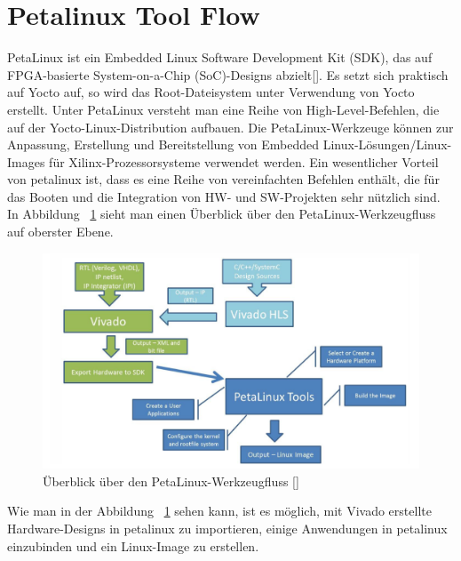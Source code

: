 \section{Petalinux Tool Flow}
\label{sec:Petalinux_Toolflow}
PetaLinux ist ein Embedded Linux Software Development Kit (SDK), das auf FPGA-basierte System-on-a-Chip (SoC)-Designs abzielt[\cite{Xilinx2020}]. Es setzt sich praktisch auf Yocto auf, so wird das Root-Dateisystem unter Verwendung von Yocto erstellt. Unter PetaLinux versteht man eine Reihe von High-Level-Befehlen, die auf der Yocto-Linux-Distribution aufbauen. Die PetaLinux-Werkzeuge können zur Anpassung, Erstellung und Bereitstellung von Embedded Linux-Lösungen/Linux-Images für Xilinx-Prozessorsysteme verwendet werden. 
Ein wesentlicher Vorteil von petalinux ist, dass es eine Reihe von vereinfachten Befehlen enthält, die für das Booten und die Integration von HW- und SW-Projekten sehr nützlich sind. In Abbildung ~\ref{fig:petalinux:tool:flow} sieht man einen Überblick über den PetaLinux-Werkzeugfluss auf oberster Ebene.
	
\begin{figure}[H]
	\begin{center}
		\includegraphics[width=1.1\textwidth]{./images/petalinux-toolflow.jpg}
	\end{center}
	\vspace{-5pt}
	\caption[PetaLinux-Werkzeugfluss]{Überblick über den PetaLinux-Werkzeugfluss [\cite{petailinuxtool}]} %
	\label{fig:petalinux:tool:flow}
	\vspace{-5pt}
\end{figure}

Wie man in der Abbildung ~\ref{fig:petalinux:tool:flow} sehen kann, ist es möglich, mit Vivado erstellte Hardware-Designs in petalinux zu importieren, einige Anwendungen in petalinux einzubinden und ein Linux-Image zu erstellen.  

